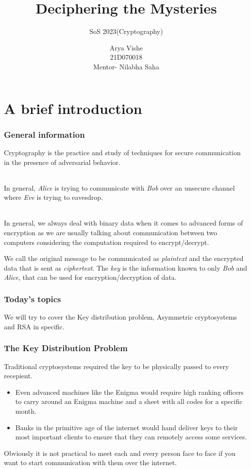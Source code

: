 \documentclass[11pt]{beamer}
\title{Deciphering the Mysteries}
\subtitle{SoS 2023(Cryptography)}
\author{Arya Vishe\\21D070018\\\small{Mentor- Nilabha Saha}}
\institute{IIT-Bombay}
\date{}
\begin{document}
\frame{\titlepage}

\section{A brief introduction}
  \begin{frame}
    \frametitle{General information}
    Cryptography is the practice and study of techniques for secure communication in the presence of adversarial behavior. \\~\\\pause

    In general, \alert{\emph{Alice}} is trying to communicate with \alert{\emph{Bob}} over an unsecure channel where \alert{\emph{Eve}} is trying to eavesdrop.\\~\\\pause

    In general, we always deal with binary data when it comes to advanced forms of encryption as we are usually talking about communication between two computers considering the \alert{computation required to encrypt/decrypt.}\pause

    We call the original message to be communicated as \alert{\emph{plaintext}} and the encrypted data that is sent as \alert{\emph{ciphertext}}. The \alert{\emph{key}} is the information known to only \emph{Bob} and \emph{Alice}, that can be used for encryption/decryption of data. 

  \end{frame}

  \begin{frame}
    \frametitle{Today's topics}
    We will try to cover the Key distribution problem, Asymmetric cryptosystems and RSA in specific.

  \end{frame}

  \begin{frame}
    \frametitle{The Key Distribution Problem}
    Traditional cryptosystems required the key to be physically passed to every recepient.\pause 
    \begin{itemize}
      \item Even advanced machines like the Enigma would require high ranking officers to carry around an Enigma machine and a sheet with all codes for a specific month.
      \item Banks in the primitive age of the internet would hand deliver keys to their most important clients to ensure that they can remotely access some services.
    \end{itemize}
    Obviously it is not practical to meet each and every person face to face if you want to start communication with them over the internet. 

  \end{frame}
\end{document}
